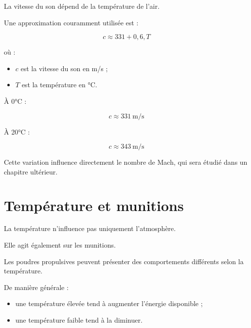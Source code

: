 La vitesse du son dépend de la température de l'air.

Une approximation couramment utilisée est :

\begin{rigueur}

\begin{equation}
c \approx 331 + 0,6,T
\label{eq:vitesse_son_temperature}
\end{equation}

où :

\begin{itemize}
\item $c$ est la vitesse du son en m/s ;
\item $T$ est la température en °C.
\end{itemize}

\end{rigueur}

\begin{exemple}

À 0°C :

\begin{equation}
c \approx 331~\mathrm{m/s}
\end{equation}

À 20°C :

\begin{equation}
c \approx 343~\mathrm{m/s}
\end{equation}

\end{exemple}

Cette variation influence directement le nombre de Mach, qui sera étudié dans
un chapitre ultérieur.

\section{Température et munitions}

La température n'influence pas uniquement l'atmosphère.

Elle agit également sur les munitions.

Les poudres propulsives peuvent présenter des comportements différents selon
la température.

De manière générale :

\begin{itemize}
\item une température élevée tend à augmenter l'énergie disponible ;
\item une température faible tend à la diminuer.
\end{itemize}

